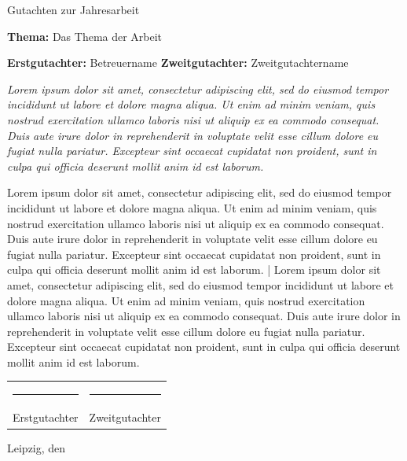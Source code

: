\documentclass[a4paper,11pt]{article}
\makeatletter
\newcommand{\finalThesis}[4]{%
  \newpage
  {\Huge{Gutachten zur Jahresarbeit}}

  \vspace{2\baselineskip}

  {\large\textbf{Thema:} #1}

  \par

  \textbf{Erstgutachter:} #2 \hspace{5em} \textbf{Zweitgutachter:} #3

  \par

  {\itshape #4}

  \par 
  \nopagebreak
  \bgroup
    \vspace{5\baselineskip minus 3\baselineskip}
    \setlength{\tabcolsep}{10mm}
  
    \begin{tabular}{@{}C{\linewidth/2-10mm}C{\linewidth/2-10mm}}
      \rule{\linewidth}{0.4pt} & \rule{\linewidth}{0.4pt}\\
      Erstgutachter & Zweitgutachter
    \end{tabular}
    \nopagebreak
    \vspace{2\baselineskip minus 0.5\baselineskip}
  
    Leipzig, den \certDateFormat\displaydate{certDate}
  \egroup
}
\makeatother
\begin{document}
  \finalThesis{Das Thema der Arbeit}{Betreuername}{Zweitgutachtername}{Lorem ipsum dolor sit amet, consectetur adipiscing elit, sed do eiusmod tempor incididunt ut labore et dolore magna aliqua. Ut enim ad minim veniam, quis nostrud exercitation ullamco laboris nisi ut aliquip ex ea commodo consequat. Duis aute irure dolor in reprehenderit in voluptate velit esse cillum dolore eu fugiat nulla pariatur. Excepteur sint occaecat cupidatat non proident, sunt in culpa qui officia deserunt mollit anim id est laborum.

Lorem ipsum dolor sit amet, consectetur adipiscing elit, sed do eiusmod tempor incididunt ut labore et dolore magna aliqua. Ut enim ad minim veniam, quis nostrud exercitation ullamco laboris nisi ut aliquip ex ea commodo consequat. Duis aute irure dolor in reprehenderit in voluptate velit esse cillum dolore eu fugiat nulla pariatur. Excepteur sint occaecat cupidatat non proident, sunt in culpa qui officia deserunt mollit anim id est laborum. | Lorem ipsum dolor sit amet, consectetur adipiscing elit, sed do eiusmod tempor incididunt ut labore et dolore magna aliqua. Ut enim ad minim veniam, quis nostrud exercitation ullamco laboris nisi ut aliquip ex ea commodo consequat. Duis aute irure dolor in reprehenderit in voluptate velit esse cillum dolore eu fugiat nulla pariatur. Excepteur sint occaecat cupidatat non proident, sunt in culpa qui officia deserunt mollit anim id est laborum.}
\end{document}

